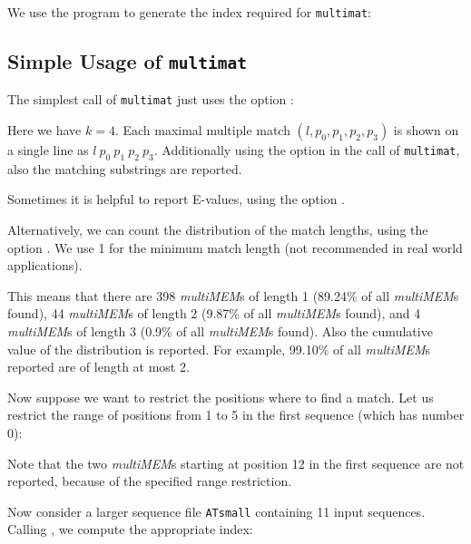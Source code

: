 \documentclass[12pt]{article}
\makeatletter
\newcommand{\MM}{\texttt{multimat}\xspace}
\newcommand{\MMEM}[0]{\textit{multiMEM}\xspace}
\newcommand{\Filename}[1]{\texttt{\small #1}\index{#1@\texttt{#1}}}
\newcommand{\EXECUTE}[1]{}
\makeatother
\begin{document}
We use the program \MKV to generate the index required for \MM:

\EXECUTE{mkvtree -pl -suf -bwt -lcp -tis -dna -db seqs4 -v}

\subsection{Simple Usage of \MM}

The simplest call of \MM just uses the option :

\EXECUTE{multimat -l 3 seqs4}

Here we have \(k=4\). Each maximal multiple match 
\((l,p_{0},p_{1},p_{2},p_{3})\) is shown on a single line
as \(l~p_{0}~p_{1}~p_{2}~p_{3}\). Additionally using the option
 in the call of \MM, also the matching substrings are reported.

\EXECUTE{multimat -l 3 -s seqs4}

Sometimes it is helpful to report E-values, using the option
.

\EXECUTE{multimat -l 3 -showevalue seqs4}

Alternatively, we can count the distribution of the match lengths, using the
option . We use 1 for the minimum match length
(not recommended in real world applications).

\EXECUTE{multimat -l 1 -count seqs4}

This means that there are 
398 \MMEM{s} of length 1 (89.24\% of all \MMEM{s} found),
44 \MMEM{s} of length 2 (9.87\% of all \MMEM{s} found), and
4 \MMEM{s} of length 3 (0.9\% of all \MMEM{s} found). Also the 
cumulative value of the distribution is reported. For example,
99.10\% of all \MMEM{s} reported are  of length at most 2.

Now suppose we want to restrict the positions where to find a
match. Let us restrict the range of positions from 1 to 5 in the
first sequence (which has number 0):

\EXECUTE{multimat -l 3 -range 0 1 5 seqs4}

Note that the two \MMEM{s} starting at position 12 in the first
sequence are not reported, because of the specified range restriction.

Now consider a larger sequence file \Filename{ATsmall} containing 11 input
sequences. Calling \MKV, we compute the appropriate index:

\EXECUTE{mkvtree -pl -suf -bwt -lcp -tis -dna -v -db ATsmall}
\end{document}
